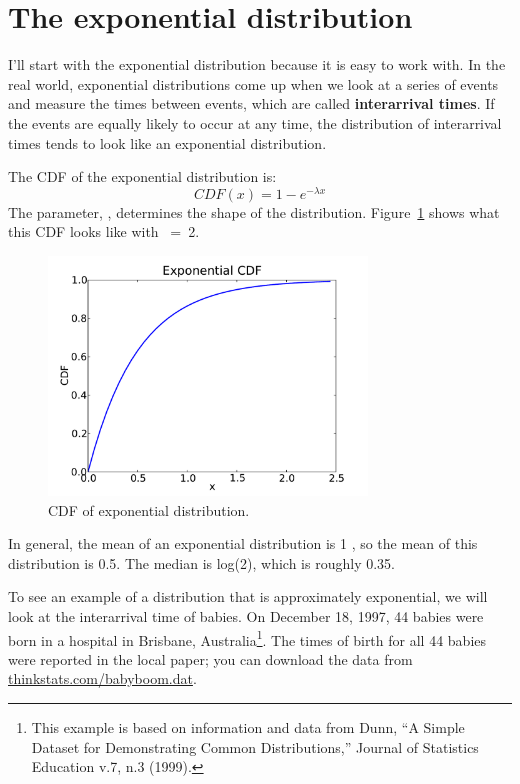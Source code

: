 \documentclass[12pt]{book}
\begin{document}
\section{The exponential distribution}

I'll start with the exponential distribution because it is
easy to work with.  In the real world, exponential distributions
come up when we look at a series of events and measure the
times between events, which are called {\bf interarrival times}.
If the events are equally likely to occur at any time, the distribution
of interarrival times tends to look like an exponential distribution.

The CDF of the exponential distribution is:
%
\[ CDF(x) = 1 - e^{-\lambda x} \]
%
The parameter, \mylambda, determines the shape of the
distribution.  Figure~\ref{expo_cdf} shows what this CDF looks like with
\mylambda~=~2.


\begin{figure}
\centerline{\includegraphics[height=2.5in]{figs/expo_cdf.pdf}}
\caption{CDF of exponential distribution.}
\label{expo_cdf}
\end{figure}

In general, the mean of an exponential distribution is 1\mydivide
\mylambda, so the mean of this distribution is 0.5.  The median is
log(2)\mydivide\mylambda, which is roughly 0.35.  
  

To see an example of a distribution that is approximately exponential,
we will look at the interarrival time of babies.
On December 18, 1997, 44 babies were born in a hospital in Brisbane,
Australia\footnote{This example is based on information and data from
  Dunn, ``A Simple Dataset for Demonstrating Common Distributions,''
  Journal of Statistics Education v.7, n.3 (1999).}.  The times of
birth for all 44 babies were reported in the local paper; you can
download the data from \url{thinkstats.com/babyboom.dat}.
\end{document}
